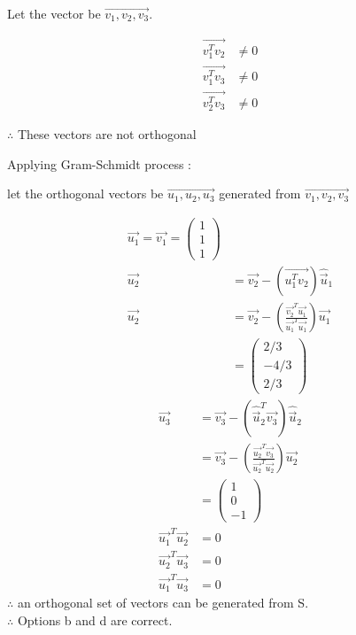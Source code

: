 \documentclass[journal]{IEEEtran}
\begin{document}
    Let the vector be $\vec{v_1, v_2, v_3}$.
    
    \begin{align}
    \vec{v_1^T v_2} &\neq 0 \\
    \vec{v_1^T v_3 }&\neq 0 \\
    \vec{v_2^T v_3 }&\neq 0
    \end{align}
    
    $\therefore$ These vectors are not orthogonal
    
    Applying Gram-Schmidt process :
    
    let the orthogonal vectors be $\vec{u_1, u_2, u_3}$ generated from $\vec{v_1, v_2, v_3}$
    
    \begin{align}\vec{u_1} = \vec{v_1} = \begin{pmatrix} 1 \\ 1\\1 \end{pmatrix}\\
\vec{u_2} &= \vec{v_2} - (\vec{u_1^T v_2}) \hat{\vec{u}}_1 \\
\vec{u_2} &= \vec{v_2} - \left(\frac{\vec{v_2}^T \vec{u_1}}{\vec{u_1}^T \vec{u_1}} \right) \vec{u_1}\\ &= \begin{pmatrix} 2/3 \\ -4/3 \\ 2/3 \end{pmatrix} 
\end{align}
\begin{align}
\vec{u_3} &= \vec{v_3} - (\hat{\vec{u}}_2^T \vec{v_3}) \hat{\vec{u}}_2 \\&= \vec{v_3} - \left( \frac{\vec{u_2}^T \vec{v_3}}{\vec{u_2}^T \vec{u_2}} \right) \vec{u_2} \\&= \begin{pmatrix} 1 \\ 0 \\ -1 \end{pmatrix}\\
\vec{u_1}^T \vec{u_2} &= 0 \\\vec{u_2}^T \vec{u_3} &= 0 \\\vec{u_1}^T \vec{u_3} &= 0
\end{align}
$\therefore$ an orthogonal set of vectors can be generated from S.\\
$\therefore$ Options b and d are correct.
\end{document}
